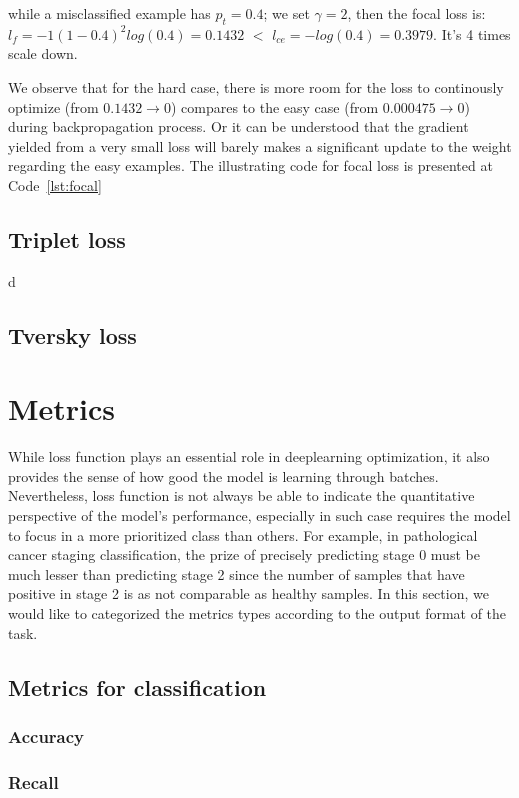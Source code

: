 while a misclassified example has $p_{t}=0.4$; we set $\gamma=2$, then the focal loss is: $l_{f} = -1(1-0.4)^{2}log(0.4)=0.1432$ $<$ $l_{ce} = -log(0.4)=0.3979$. It's 4 times scale down.\newline

We observe that for the hard case, there is more room for the loss to continously optimize (from $0.1432 \rightarrow 0$) compares to the easy case (from $0.000475 \rightarrow 0$) during backpropagation process. Or it can be understood that the gradient yielded from a very small loss will barely makes a significant update to the weight regarding the easy examples. The illustrating code for focal loss is presented at Code~\ref{lst:focal}


\subsection{Triplet loss}
d
\subsection{Tversky loss}


\section{Metrics}
While loss function plays an essential role in deeplearning optimization, it also provides the sense of how good the model is learning through batches. Nevertheless, loss function is not always be able to indicate the quantitative perspective of the model's performance, especially in such case requires the model to focus in a more prioritized class than others. For example, in pathological cancer staging classification, the prize of precisely predicting stage 0 must be much lesser than predicting stage 2 since the number of samples that have positive in stage 2 is as not comparable as healthy samples.
In this section, we would like to categorized the metrics types according to the output format of the task.
\subsection{Metrics for classification}

\subsubsection{Accuracy}
\subsubsection{Recall}
